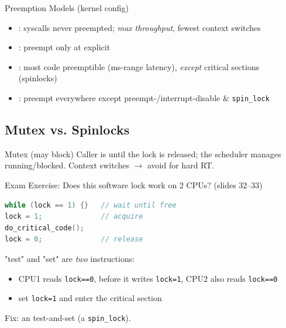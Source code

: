 \multend

\begin{definition}{Preemption Models (kernel config)}
    \begin{itemize}
        \item {}: syscalls never preempted;
              \emph{max throughput}, fewest context switches
        \item {}: preempt only at explicit
        \item {}: most code preemptible
              (ms-range latency), \emph{except} critical sections (spinlocks)
        \item {}: preempt everywhere except
              preempt-/interrupt-disable \& \texttt{spin\_lock}
    \end{itemize}
\end{definition}

\subsection{Mutex vs. Spinlocks}

\begin{definition}{Mutex (may block)}
    Caller is  until the lock is released; the scheduler manages
    running/blocked. Context switches  $\to$ avoid for hard RT.
\end{definition}

\begin{example2}{Exam Exercise: Does this software lock work on 2 CPUs? (slides 32--33)}
\begin{lstlisting}[language=C, style=basesmol, aboveskip=2pt, belowskip=2pt]
while (lock == 1) {}   // wait until free
lock = 1;              // acquire
do_critical_code();
lock = 0;              // release
\end{lstlisting}
    \tcblower
     "test" and "set" are \emph{two}
    instructions:
    \begin{itemize}
        \item CPU1 reads \texttt{lock==0}, before it writes \texttt{lock=1}, CPU2 also
              reads \texttt{lock==0}
        \item {} set \texttt{lock=1} and enter the critical section
    \end{itemize}
    Fix: an  test-and-set (a \texttt{spin\_lock}).
\end{example2}

